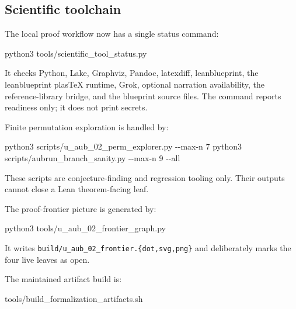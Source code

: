 \documentclass[
]{article}
\newenvironment{Shaded}{}{}
\newcommand{\NormalTok}[1]{#1}
\begin{document}
\subsection{Scientific toolchain}\label{scientific-toolchain}

The local proof workflow now has a single status command:

\begin{Shaded}
\begin{Highlighting}[]
\NormalTok{python3 tools/scientific\_tool\_status.py}
\end{Highlighting}
\end{Shaded}

It checks Python, Lake, Graphviz, Pandoc, latexdiff, leanblueprint, the
leanblueprint plasTeX runtime, Grok, optional narration availability,
the reference-library bridge, and the blueprint source files. The
command reports readiness only; it does not print secrets.

Finite permutation exploration is handled by:

\begin{Shaded}
\begin{Highlighting}[]
\NormalTok{python3 scripts/u\_aub\_02\_perm\_explorer.py {-}{-}max{-}n 7}
\NormalTok{python3 scripts/aubrun\_branch\_sanity.py {-}{-}max{-}n 9 {-}{-}all}
\end{Highlighting}
\end{Shaded}

These scripts are conjecture-finding and regression tooling only. Their
outputs cannot close a Lean theorem-facing leaf.

The proof-frontier picture is generated by:

\begin{Shaded}
\begin{Highlighting}[]
\NormalTok{python3 tools/u\_aub\_02\_frontier\_graph.py}
\end{Highlighting}
\end{Shaded}

It writes \texttt{build/u\_aub\_02\_frontier.\{dot,svg,png\}} and
deliberately marks the four live leaves as open.

The maintained artifact build is:

\begin{Shaded}
\begin{Highlighting}[]
\NormalTok{tools/build\_formalization\_artifacts.sh}
\end{Highlighting}
\end{Shaded}
\end{document}
